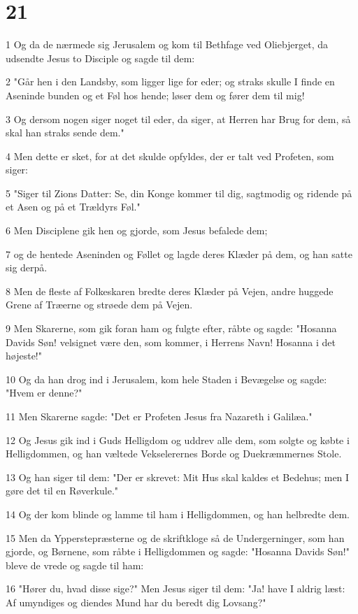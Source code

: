 \chapter{21}

\par 1 Og da de nærmede sig Jerusalem og kom til Bethfage ved Oliebjerget, da udsendte Jesus to Disciple og sagde til dem:
\par 2 "Går hen i den Landsby, som ligger lige for eder; og straks skulle I finde en Aseninde bunden og et Føl hos hende; løser dem og fører dem til mig!
\par 3 Og dersom nogen siger noget til eder, da siger, at Herren har Brug for dem, så skal han straks sende dem."
\par 4 Men dette er sket, for at det skulde opfyldes, der er talt ved Profeten, som siger:
\par 5 "Siger til Zions Datter: Se, din Konge kommer til dig, sagtmodig og ridende på et Asen og på et Trældyrs Føl."
\par 6 Men Disciplene gik hen og gjorde, som Jesus befalede dem;
\par 7 og de hentede Aseninden og Føllet og lagde deres Klæder på dem, og han satte sig derpå.
\par 8 Men de fleste af Folkeskaren bredte deres Klæder på Vejen, andre huggede Grene af Træerne og strøede dem på Vejen.
\par 9 Men Skarerne, som gik foran ham og fulgte efter, råbte og sagde: "Hosanna Davids Søn! velsignet være den, som kommer, i Herrens Navn! Hosanna i det højeste!"
\par 10 Og da han drog ind i Jerusalem, kom hele Staden i Bevægelse og sagde: "Hvem er denne?"
\par 11 Men Skarerne sagde: "Det er Profeten Jesus fra Nazareth i Galilæa."
\par 12 Og Jesus gik ind i Guds Helligdom og uddrev alle dem, som solgte og købte i Helligdommen, og han væltede Vekselerernes Borde og Duekræmmernes Stole.
\par 13 Og han siger til dem: "Der er skrevet: Mit Hus skal kaldes et Bedehus; men I gøre det til en Røverkule."
\par 14 Og der kom blinde og lamme til ham i Helligdommen, og han helbredte dem.
\par 15 Men da Ypperstepræsterne og de skriftkloge så de Undergerninger, som han gjorde, og Børnene, som råbte i Helligdommen og sagde: "Hosanna Davids Søn!" bleve de vrede og sagde til ham:
\par 16 "Hører du, hvad disse sige?" Men Jesus siger til dem: "Ja! have I aldrig læst: Af umyndiges og diendes Mund har du beredt dig Lovsang?"
